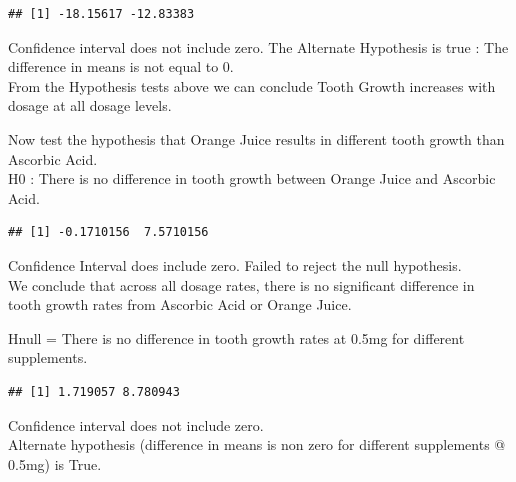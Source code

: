 \documentclass[]{article}
\newenvironment{Shaded}{\begin{snugshade}}{\end{snugshade}}
\newcommand{\KeywordTok}[1]{\textcolor[rgb]{0.13,0.29,0.53}{\textbf{{#1}}}}
\newcommand{\DecValTok}[1]{\textcolor[rgb]{0.00,0.00,0.81}{{#1}}}
\newcommand{\FloatTok}[1]{\textcolor[rgb]{0.00,0.00,0.81}{{#1}}}
\newcommand{\StringTok}[1]{\textcolor[rgb]{0.31,0.60,0.02}{{#1}}}
\newcommand{\NormalTok}[1]{{#1}}
\begin{document}
\begin{verbatim}
## [1] -18.15617 -12.83383
\end{verbatim}

Confidence interval does not include zero. The Alternate Hypothesis is
true : The difference in means is not equal to 0.\\From the Hypothesis
tests above we can conclude Tooth Growth increases with dosage at all
dosage levels.

Now test the hypothesis that Orange Juice results in different tooth
growth than Ascorbic Acid.\\H0 : There is no difference in tooth growth
between Orange Juice and Ascorbic Acid.

\begin{Shaded}
\end{Shaded}

\begin{verbatim}
## [1] -0.1710156  7.5710156
\end{verbatim}

Confidence Interval does include zero. Failed to reject the null
hypothesis.\\We conclude that across all dosage rates, there is no
significant difference in tooth growth rates from Ascorbic Acid or
Orange Juice.

Hnull = There is no difference in tooth growth rates at 0.5mg for
different supplements.

\begin{Shaded}
\end{Shaded}

\begin{verbatim}
## [1] 1.719057 8.780943
\end{verbatim}

Confidence interval does not include zero.\\Alternate hypothesis
(difference in means is non zero for different supplements @ 0.5mg) is
True.
\end{document}
